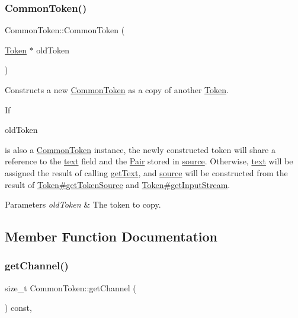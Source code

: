 \subsubsection{\texorpdfstring{Common\+Token()}{CommonToken()}\hspace{0.1cm}{\footnotesize\ttfamily [3/3]}}
{\footnotesize\ttfamily Common\+Token\+::\+Common\+Token (\begin{DoxyParamCaption}\item[{\hyperlink{classantlr4_1_1Token}{Token} $\ast$}]{old\+Token }\end{DoxyParamCaption})}

Constructs a new \hyperlink{classantlr4_1_1CommonToken}{Common\+Token} as a copy of another \hyperlink{classantlr4_1_1Token}{Token}.

If
\begin{DoxyCode}
oldToken 
\end{DoxyCode}
 is also a \hyperlink{classantlr4_1_1CommonToken}{Common\+Token} instance, the newly constructed token will share a reference to the \hyperlink{}{text} field and the \hyperlink{}{Pair} stored in \hyperlink{}{source}. Otherwise, \hyperlink{}{text} will be assigned the result of calling \hyperlink{classantlr4_1_1CommonToken_abd1d06568aa3d4aa0180b9ca316ecfcd}{get\+Text}, and \hyperlink{}{source} will be constructed from the result of \hyperlink{classantlr4_1_1Token_ad557fbfa499a36703b427b3f5f35baeb}{Token\#get\+Token\+Source} and \hyperlink{classantlr4_1_1Token_a777d6dac8e4a0b9552b4860685ebc128}{Token\#get\+Input\+Stream}.


\begin{DoxyParams}{Parameters}
{\em old\+Token} & The token to copy. \\
\hline
\end{DoxyParams}


\subsection{Member Function Documentation}
\mbox{\label{classantlr4_1_1CommonToken_a30b47e4ec7c1b02bde9b38530d8fe358}} 
\subsubsection{\texorpdfstring{get\+Channel()}{getChannel()}}
{\footnotesize\ttfamily size\+\_\+t Common\+Token\+::get\+Channel (\begin{DoxyParamCaption}{ }\end{DoxyParamCaption}) const\hspace{0.3cm}{\ttfamily [override]}, {\ttfamily [virtual]}}

